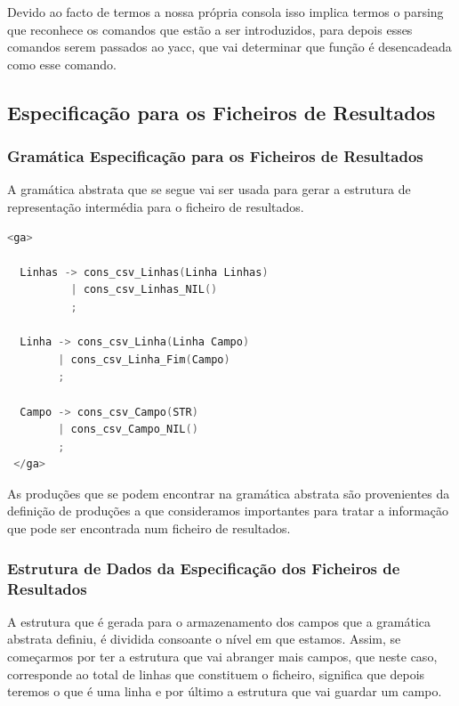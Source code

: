 \documentclass[11pt, a4paper, oneside]{article}
\begin{document}
Devido ao facto de termos a nossa própria consola isso implica termos o parsing que reconhece os comandos que estão a ser introduzidos, para depois esses comandos serem passados ao \textsf{yacc}, que vai determinar que função é desencadeada como esse comando.

\subsection{Especificação para os Ficheiros de Resultados}

\subsubsection{Gramática Especificação para os Ficheiros de Resultados}

A gramática abstrata que se segue vai ser usada para gerar a estrutura de representação intermédia para o ficheiro de resultados.

\begin{lstlisting}[language=C, caption={Gramática para a linguagem de especificação para os ficheiros de resultados.}]
<ga>
  
  Linhas -> cons_csv_Linhas(Linha Linhas)
          | cons_csv_Linhas_NIL()
          ;

  Linha -> cons_csv_Linha(Linha Campo)
        | cons_csv_Linha_Fim(Campo)
        ;

  Campo -> cons_csv_Campo(STR)
        | cons_csv_Campo_NIL()
        ;
 </ga>
\end{lstlisting}

As produções que se podem encontrar na gramática abstrata são provenientes da definição de produções a que consideramos importantes para tratar a informação que pode ser encontrada num ficheiro de resultados.

\subsubsection{Estrutura de Dados da Especificação dos Ficheiros de Resultados}

A estrutura que é gerada para o armazenamento dos campos que a gramática abstrata definiu, é dividida consoante o nível em que estamos. Assim, se começarmos por ter a estrutura que vai abranger mais campos, que neste caso, corresponde ao total de linhas que constituem o ficheiro, significa que depois teremos o que é uma linha e por último a estrutura que vai guardar um campo.
\end{document}
